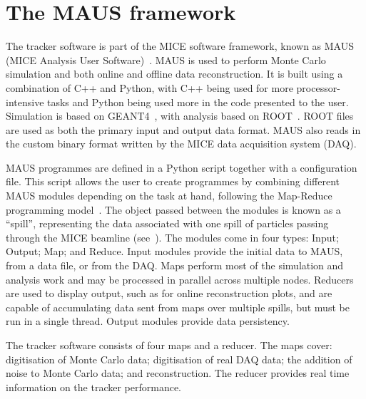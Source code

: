 \section{The MAUS framework}
\label{sec:MAUS}
The tracker software is part of the MICE software framework, known as MAUS (MICE Analysis User Software)~\cite{MausPaper}. MAUS is used to perform Monte Carlo simulation and both online and offline data reconstruction. It is built using a combination of C++ and Python, with C++ being used for more processor-intensive tasks and Python being used more in the code presented to the user.  Simulation is based on GEANT4~\cite{GEANT4}, with analysis based on ROOT~\cite{ROOT}.  ROOT files are used as both the primary input and output data format. MAUS also reads in the custom binary format written by the MICE data acquisition system (DAQ). 

MAUS programmes are defined in a Python script together with a configuration file.  This script allows the user to create programmes by combining different MAUS modules depending on the task at hand, following the Map-Reduce programming model~\cite{MapReduce}. The object passed between the modules is known as a ``spill'', representing the data associated with one spill of particles passing through the MICE beamline (see~\cite{MiceBeamline}).  The modules come in four types: Input; Output; Map; and Reduce.  Input modules provide the initial data to MAUS, from a data file, or from the DAQ. Maps perform most of the simulation and analysis work and may be processed in parallel across multiple nodes.  Reducers are used to display output, such as for online reconstruction plots, and are capable of accumulating data sent from maps over multiple spills, but must be run in a single thread. Output modules provide data persistency.

The tracker software consists of four maps and a reducer. The maps cover: digitisation of Monte Carlo data; digitisation of real DAQ data; the addition of noise to Monte Carlo data; and reconstruction. The reducer provides real time information on the tracker performance.  %